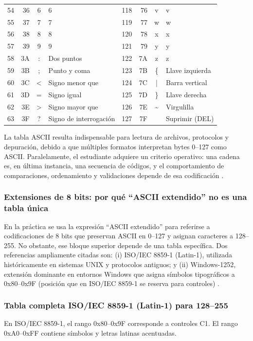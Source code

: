 \documentclass[12pt,twoside]{book}
\begin{document}
\begin{longtable}{r r c l r r c l}
				54 & 36 & 6 & 6 & 118 & 76 & v & v \\
				55 & 37 & 7 & 7 & 119 & 77 & w & w \\
				56 & 38 & 8 & 8 & 120 & 78 & x & x \\
				57 & 39 & 9 & 9 & 121 & 79 & y & y \\
				58 & 3A & : & Dos puntos & 122 & 7A & z & z \\
				59 & 3B & ; & Punto y coma & 123 & 7B & \{ & Llave izquierda \\
				60 & 3C & < & Signo menor que & 124 & 7C & | & Barra vertical \\
				61 & 3D & = & Signo igual & 125 & 7D & \} & Llave derecha \\
				62 & 3E & > & Signo mayor que & 126 & 7E & \textasciitilde & Virgulilla \\
				63 & 3F & ? & Signo de interrogación & 127 & 7F &  & Suprimir (DEL) \\
			\end{longtable}
			
			\noindent
			La tabla ASCII resulta indispensable para lectura de archivos, protocolos y depuración, debido a que múltiples formatos interpretan bytes 0--127 como ASCII. Paralelamente, el estudiante adquiere un criterio operativo: una cadena es, en última instancia, una secuencia de códigos, y el comportamiento de comparaciones, ordenamiento y validaciones depende de esa codificación \cite{Cerf1969ASCII,Unicode2025Standard}.
			
			\subsubsection{Extensiones de 8 bits: por qué ``ASCII extendido'' no es una tabla única}
				\noindent
				En la práctica se usa la expresión ``ASCII extendido'' para referirse a codificaciones de 8 bits que preservan ASCII en 0--127 y asignan caracteres a 128--255. No obstante, ese bloque superior depende de una tabla específica. Dos referencias ampliamente citadas son: (i) ISO/IEC 8859-1 (Latin-1), utilizada históricamente en sistemas UNIX y protocolos antiguos; y (ii) Windows-1252, extensión dominante en entornos Windows que asigna símbolos tipográficos a 0x80--0x9F (posición que en ISO/IEC 8859-1 se reserva para controles) \cite{ISOIEC1998Information,Microsoft2021CodePage,Unicode2025Standard}.
				
				\subsubsection*{Tabla completa ISO/IEC 8859-1 (Latin-1) para 128--255}
				\noindent
					En ISO/IEC 8859-1, el rango 0x80--0x9F corresponde a controles C1. El rango 0xA0--0xFF contiene símbolos y letras latinas acentuadas.
					
\end{document}
